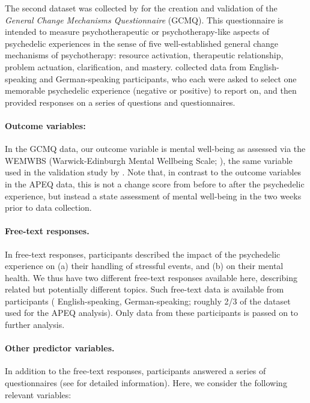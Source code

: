 \documentclass[man,floatsintext]{apa7}
\newcommand{\change}[1]{#1}
\begin{document}
The second dataset was collected by \textcite{wolff2024measuring} for the creation and validation of the \emph{General Change Mechanisms Questionnaire} (GCMQ). This questionnaire is \change{intended to measure psychotherapeutic or psychotherapy-like aspects of psychedelic experiences in the sense of five well-established general change mechanisms of psychotherapy:} resource activation, therapeutic relationship, problem actuation, clarification, and mastery.\textcite{wolff2024measuring} collected data from  English-speaking and  German-speaking participants, who each were asked to select one memorable psychedelic experience (negative or positive) to report on, and then provided responses on a series of questions and questionnaires. 


\paragraph{Outcome variables:} In the GCMQ data, our outcome variable is mental well-being as assessed via the WEMWBS (Warwick-Edinburgh Mental Wellbeing
Scale; \cite{tennant2007warwick}), the same variable used in the validation study by \textcite{wolff2024measuring}. Note that, in contrast to the outcome variables in the APEQ data, this is not a change score from before to after the psychedelic experience, but instead a state assessment of mental well-being in the two weeks prior to data collection.


\paragraph{Free-text responses.} In free-text responses, participants described the impact of the psychedelic experience on (a) their handling of stressful events, and  (b) on their mental health. We thus have two different free-text responses available here, describing related but potentially different topics. Such free-text data is available from  participants ( English-speaking,  German-speaking; roughly 2/3 of the dataset used for the APEQ analysis). Only data from these  participants is passed on to further analysis.


\paragraph{Other predictor variables.} In addition to the free-text responses, participants answered a series of questionnaires (see  \cite{wolff2024measuring} for detailed information). Here, we consider the following relevant variables:
\end{document}
